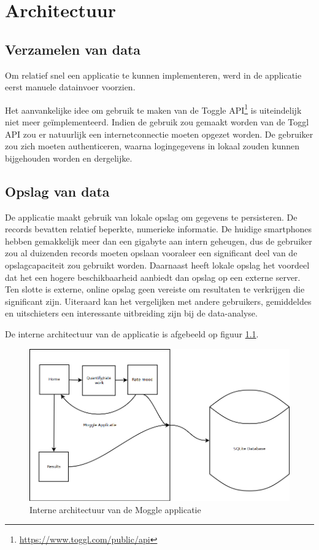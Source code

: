 \chapter{Architectuur}\label{chapter:architectuur}

\section{Verzamelen van data}\label{section:manuele_datainvoer}

Om relatief snel een applicatie te kunnen implementeren, werd in de applicatie eerst manuele datainvoer voorzien.

Het aanvankelijke idee om gebruik te maken van de Toggle API\footnote{\url{https://www.toggl.com/public/api}} is uiteindelijk niet meer ge\"implementeerd. Indien de gebruik zou gemaakt worden van de Toggl API zou er natuurlijk een internetconnectie moeten opgezet worden. De gebruiker zou zich moeten authenticeren, waarna logingegevens in lokaal zouden kunnen bijgehouden worden en dergelijke.


\section{Opslag van data}\label{section:local_storage}

De applicatie maakt gebruik van lokale opslag om gegevens te persisteren. De records bevatten relatief beperkte, numerieke informatie. De huidige smartphones hebben gemakkelijk meer dan een gigabyte aan intern geheugen\cite{schiesser2012}, dus de gebruiker zou al duizenden records moeten opslaan vooraleer een significant deel van de opslagcapaciteit zou gebruikt worden. Daarnaast heeft lokale opslag het voordeel dat het een hogere beschikbaarheid aanbiedt dan opslag op een externe server. Ten slotte is externe, online opslag geen vereiste om resultaten te verkrijgen die significant zijn. Uiteraard kan het vergelijken met andere gebruikers, gemiddeldes en uitschieters een interessante uitbreiding zijn bij de data-analyse.

De interne architectuur van de applicatie is afgebeeld op figuur \ref{fig:architecture}.

\begin{figure}
  \begin{center}
  \includegraphics[scale=0.35]{data/internal-architecture}
	\end{center}
  \caption{Interne architectuur van de Moggle applicatie}
  \label{fig:architecture}
\end{figure}






